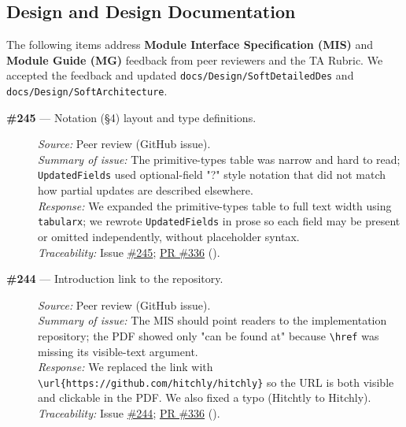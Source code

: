 \documentclass{article}
\begin{document}
\subsection{Design and Design Documentation}

The following items address \textbf{Module Interface Specification (MIS)} and \textbf{Module Guide (MG)} feedback from peer reviewers and the TA Rubric. We accepted the feedback and updated \texttt{docs/Design/SoftDetailedDes} and \texttt{docs/Design/SoftArchitecture}.

\begin{description}
  \item[\textbf{\#245} --- Notation (\S4) layout and type definitions.]
  \textit{Source:} Peer review (GitHub issue). \\
  \textit{Summary of issue:} The primitive-types table was narrow and hard to read; \texttt{UpdatedFields} used optional-field "?" style notation that did not match how partial updates are described elsewhere. \\
  \textit{Response:} We expanded the primitive-types table to full text width using \texttt{tabularx}; we rewrote \texttt{UpdatedFields} in prose so each field may be present or omitted independently, without placeholder syntax. \\
  \textit{Traceability:} Issue \href{https://github.com/hitchly/hitchly/issues/245}{\#245}; \href{https://github.com/hitchly/hitchly/pull/336}{PR \#336} ().

  \item[\textbf{\#244} --- Introduction link to the repository.]
  \textit{Source:} Peer review (GitHub issue). \\
  \textit{Summary of issue:} The MIS should point readers to the implementation repository; the PDF showed only "can be found at" because \texttt{\textbackslash href} was missing its visible-text argument. \\
  \textit{Response:} We replaced the link with \texttt{\textbackslash url\{https://github.com/hitchly/hitchly\}} so the URL is both visible and clickable in the PDF. We also fixed a typo (Hitchtly to Hitchly). \\
  \textit{Traceability:} Issue \href{https://github.com/hitchly/hitchly/issues/244}{\#244}; \href{https://github.com/hitchly/hitchly/pull/336}{PR \#336} ().


\end{description}
\end{document}
